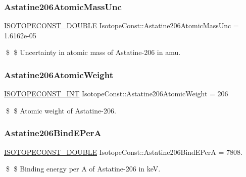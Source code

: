 \subsubsection{\texorpdfstring{Astatine206\+Atomic\+Mass\+Unc}{Astatine206AtomicMassUnc}}
{\footnotesize\ttfamily \mbox{\hyperlink{group___isotope_const-_macros_ga8f45a7272ce02c0b4c65c44636ed719a}{I\+S\+O\+T\+O\+P\+E\+C\+O\+N\+S\+T\+\_\+\+D\+O\+U\+B\+LE}} Isotope\+Const\+::\+Astatine206\+Atomic\+Mass\+Unc = 1.\+6162e-\/05}

\$ \$ Uncertainty in atomic mass of Astatine-\/206 in amu. \mbox{\label{group___isotope_const-_astatine-_at206_gae287c4f2af68b3f60b78c5457e78764b}} 
\subsubsection{\texorpdfstring{Astatine206\+Atomic\+Weight}{Astatine206AtomicWeight}}
{\footnotesize\ttfamily \mbox{\hyperlink{group___isotope_const-_macros_ga5f18360b3e99483a35c32d789e62621c}{I\+S\+O\+T\+O\+P\+E\+C\+O\+N\+S\+T\+\_\+\+I\+NT}} Isotope\+Const\+::\+Astatine206\+Atomic\+Weight = 206}

\$ \$ Atomic weight of Astatine-\/206. \mbox{\label{group___isotope_const-_astatine-_at206_gaf96f8f1b1b83e9c382b8c5102b82494f}} 
\subsubsection{\texorpdfstring{Astatine206\+Bind\+E\+PerA}{Astatine206BindEPerA}}
{\footnotesize\ttfamily \mbox{\hyperlink{group___isotope_const-_macros_ga8f45a7272ce02c0b4c65c44636ed719a}{I\+S\+O\+T\+O\+P\+E\+C\+O\+N\+S\+T\+\_\+\+D\+O\+U\+B\+LE}} Isotope\+Const\+::\+Astatine206\+Bind\+E\+PerA = 7808.}

\$ \$ Binding energy per A of Astatine-\/206 in keV. \mbox{\label{group___isotope_const-_astatine-_at206_gade0992e34b70f41658f756a9ac681db5}} 
